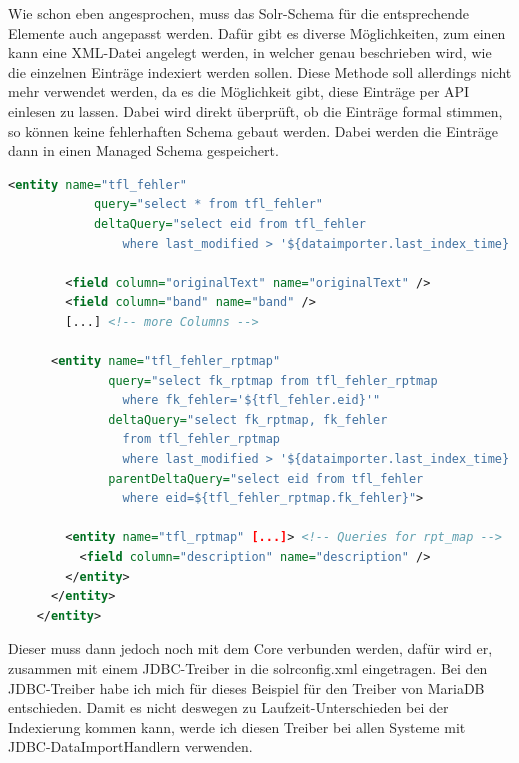 Wie schon eben angesprochen, muss das Solr-Schema für die entsprechende Elemente auch angepasst werden. Dafür gibt es diverse Möglichkeiten, zum einen kann eine XML-Datei angelegt werden, in welcher genau beschrieben wird, wie die einzelnen Einträge indexiert werden sollen. Diese Methode soll allerdings nicht mehr verwendet werden, da es die Möglichkeit gibt, diese Einträge per API einlesen zu lassen. Dabei wird direkt überprüft, ob die Einträge formal stimmen, so können keine fehlerhaften Schema gebaut werden. Dabei werden die Einträge dann in einen Managed Schema gespeichert. 

\begin{lstlisting}[language=xml, frame=single, label={lst:dih}, 
    morekeywords={entity,query,deltaQuery,parentDeltaQuery,field,column, name}] 
    <entity name="tfl_fehler" 
            query="select * from tfl_fehler" 
            deltaQuery="select eid from tfl_fehler 
                where last_modified > '${dataimporter.last_index_time}'"> 

		<field column="originalText" name="originalText" />
		<field column="band" name="band" />
        [...] <!-- more Columns -->

      <entity name="tfl_fehler_rptmap"
              query="select fk_rptmap from tfl_fehler_rptmap 
                where fk_fehler='${tfl_fehler.eid}'"
              deltaQuery="select fk_rptmap, fk_fehler 
                from tfl_fehler_rptmap 
                where last_modified > '${dataimporter.last_index_time}'"
              parentDeltaQuery="select eid from tfl_fehler
                where eid=${tfl_fehler_rptmap.fk_fehler}">

        <entity name="tfl_rptmap" [...]> <!-- Queries for rpt_map -->
          <field column="description" name="description" />
        </entity>
      </entity>
    </entity>
\end{lstlisting}

Dieser muss dann jedoch noch mit dem Core verbunden werden, dafür wird er, zusammen mit einem JDBC-Treiber in die solrconfig.xml eingetragen. Bei den JDBC-Treiber habe ich mich für dieses Beispiel für den Treiber von MariaDB entschieden. Damit es nicht deswegen zu Laufzeit-Unterschieden bei der Indexierung kommen kann, werde ich diesen Treiber bei allen Systeme mit JDBC-DataImportHandlern verwenden.

